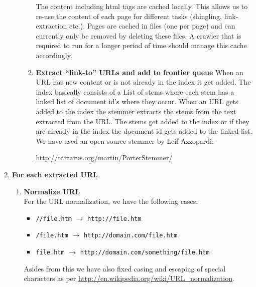 \begin{enumerate}[label=\textbf{\arabic*.}]
\begin{enumerate}[label=\textbf{\alph*)}]
\begin{enumerate}[label=\textbf{\roman*.}]
			The content including html tags are cached locally.
			This allows us to re-use the content of each page for different tasks (shingling, link-extraction etc.).
			Pages are cached in files (one per page) and can currently only be removed by deleting these files.
			A crawler that is required to run for a longer period of time should manage this cache accordingly.
			
			\item\textbf{ Extract “link-to” URLs and add to frontier queue}
			When an URL has new content or is not already in the index it get added.
			The index basically consists of a List of stems where each stem has a linked list of document id's where they occur.
			When an URL gets added to the index the stemmer extracts the stems from the text extracted from the URL.
			The stems get added to the index or if they are already in the index the document id gets added to the linked list.
			We have used an open-source stemmer by Leif Azzopardi:
			\begin{center}
			\url{http://tartarus.org/martin/PorterStemmer/}
			\end{center}
			
		\end{enumerate}
	\end{enumerate}
	
	\item \textbf{For each extracted URL}
	\begin{enumerate}[label=\textbf{\alph*)}]
		\item \textbf{Normalize URL}\\
		For the URL normalization, we have the following cases:
		\begin{itemize}
		\item \texttt{//file.htm} $\rightarrow$ \texttt{http://file.htm}
		\item \texttt{/file.htm} $\rightarrow$ \texttt{http://domain.com/file.htm}
		\item \texttt{file.htm} $\rightarrow$ \texttt{http://domain.com/something/file.htm}
		\end{itemize}
		Asides from this we have also fixed casing and escaping of special characters as per \url{http://en.wikipedia.org/wiki/URL_normalization}.
		

\end{enumerate}
\end{enumerate}
